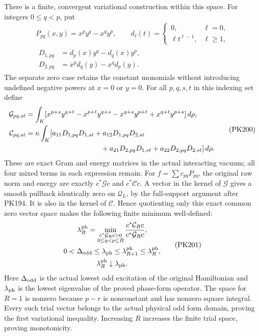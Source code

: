 \documentclass[11pt]{article}
\begin{document}
There is a finite, convergent variational construction within this
space. For integers \(0\le q<p\), put
\[
 \begin{gathered}
 P_{pq}(x,y)=x^py^q-x^qy^p,\qquad
 d_\ell(t)=
 \begin{cases}0,&\ell=0,\\ \ell t^{\ell-1},&\ell\ge1,\end{cases}
 \\
 \begin{aligned}
 D_{1,pq}&=d_p(x)y^q-d_q(x)y^p,\\
 D_{2,pq}&=x^pd_q(y)-x^qd_p(y).
 \end{aligned}
 \end{gathered}\tag{PK199}
\]
The separate zero case retains the constant monomials without
introducing undefined negative powers at \(x=0\) or \(y=0\).
For all \(p,q,s,t\) in this indexing set define
\[
 \begin{split}
 \mathcal G_{pq,st}
 &=\int_K[
 x^{p+s}y^{q+t}-x^{p+t}y^{q+s}
             -x^{q+s}y^{p+t}+x^{q+t}y^{p+s}]\,d\rho,\\
 \mathcal C_{pq,st}
 &=\kappa\int_K[
 a_{11}D_{1,pq}D_{1,st}+a_{12}D_{1,pq}D_{2,st}\\
 &\hspace{37mm}
 +a_{21}D_{2,pq}D_{1,st}+a_{22}D_{2,pq}D_{2,st}]\,d\rho .
 \end{split}\tag{PK200}
\]
These are exact Gram and energy matrices in the actual interacting
vacuum; all four mixed terms in each expression remain.
For \(f=\sum c_{pq}P_{pq}\), the original raw norm and energy are
exactly \(c^*\mathcal Gc\) and \(c^*\mathcal Cc\).
A vector in the kernel of \(\mathcal G\) gives a smooth pullback
identically zero on \(\mathcal Q_L\), by the full-support argument
after PK194. It is also in the kernel of \(\mathcal C\).
Hence quotienting only this exact common zero vector space makes
the following finite minimum well-defined:
\[
 \begin{gathered}
 \lambda_R^{\rm ph}
 =\min_{\substack{c^*\mathcal G_Rc>0\\0\le q<p\le R}}
               \frac{c^*\mathcal C_Rc}{c^*\mathcal G_Rc},\\
 0<\Delta_{\rm odd}\le\lambda_{\rm ph}
       \le\lambda_{R+1}^{\rm ph}\le\lambda_R^{\rm ph},\\
 \lambda_R^{\rm ph}\downarrow\lambda_{\rm ph}.
 \end{gathered}
 \tag{PK201}
\]
Here \(\Delta_{\rm odd}\) is the actual lowest odd excitation of
the original Hamiltonian and \(\lambda_{\rm ph}\) is the lowest
eigenvalue of the proved phase-form operator.
The space for \(R=1\) is nonzero because \(p-r\) is nonconstant
and has nonzero square integral. Every such trial vector belongs
to the actual physical odd form domain, proving the first
variational inequality. Increasing \(R\) increases the finite
trial space, proving monotonicity.
\end{document}
